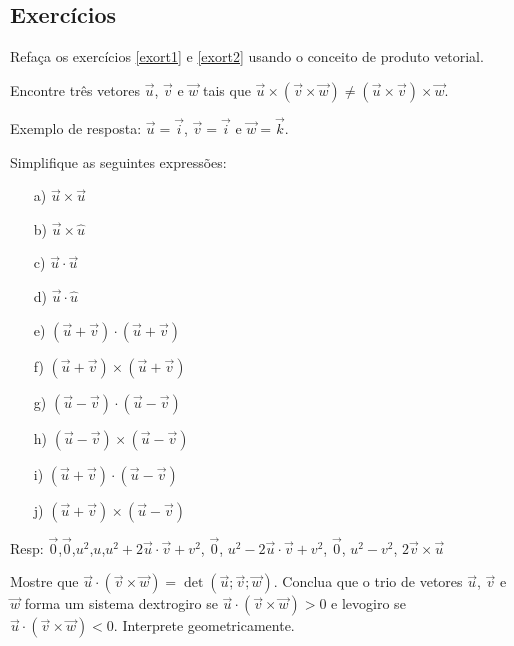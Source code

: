 \construirExeresol
\subsection*{Exercícios}

\construirExer



\begin{exer} Refaça os exercícios \ref{exort1} e \ref{exort2} usando o conceito de produto vetorial.
\end{exer}

\begin{exer}\label{prodvecnaoassoc} Encontre três vetores $\vec{u}$, $\vec{v}$ e $\vec{w}$ tais que $\vec{u}\times\left(\vec{v}\times\vec{w}\right)\neq \left(\vec{u}\times\vec{v}\right)\times \vec{w}$. 
\end{exer}
Exemplo de resposta: $\vec{u}=\vec{i}$, $\vec{v}=\vec{i}$ e $\vec{w}=\vec{k}$.

\begin{exer} Simplifique as seguintes expressões:
\begin{itemize}
\item[a)] $\vec{u}\times\vec{u}$
\item[b)] $\vec{u}\times\hat{u}$
\item[c)] $\vec{u}\cdot\vec{u}$
\item[d)] $\vec{u}\cdot\hat{u}$
\item[e)] $\left(\vec{u}+\vec{v}\right)\cdot\left(\vec{u}+\vec{v}\right)$
\item[f)] $\left(\vec{u}+\vec{v}\right)\times\left(\vec{u}+\vec{v}\right)$
\item[g)] $\left(\vec{u}-\vec{v}\right)\cdot\left(\vec{u}-\vec{v}\right)$
\item[h)] $\left(\vec{u}-\vec{v}\right)\times\left(\vec{u}-\vec{v}\right)$
\item[i)] $\left(\vec{u}+\vec{v}\right)\cdot\left(\vec{u}-\vec{v}\right)$
\item[j)] $\left(\vec{u}+\vec{v}\right)\times\left(\vec{u}-\vec{v}\right)$
\end{itemize}
\end{exer}
Resp: $\vec{0}$,$\vec{0}$,$u^2$,$u$,$u^2+2\vec{u}\cdot\vec{v}+v^2$, $\vec{0}$, $u^2-2\vec{u}\cdot\vec{v}+v^2$, $\vec{0}$, $u^2-v^2$, $2\vec{v}\times\vec{u}$ 


\begin{exer} Mostre que $\vec{u}\cdot \left(\vec{v}\times\vec{w}\right)=\det\left(\vec{u};\vec{v};\vec{w}\right)$. Conclua que o trio de vetores $\vec{u}$, $\vec{v}$ e $\vec{w}$ forma um sistema dextrogiro se $\vec{u}\cdot \left(\vec{v}\times\vec{w}\right)>0$ e levogiro se $\vec{u}\cdot \left(\vec{v}\times\vec{w}\right)<0$. Interprete geometricamente.
\end{exer}

